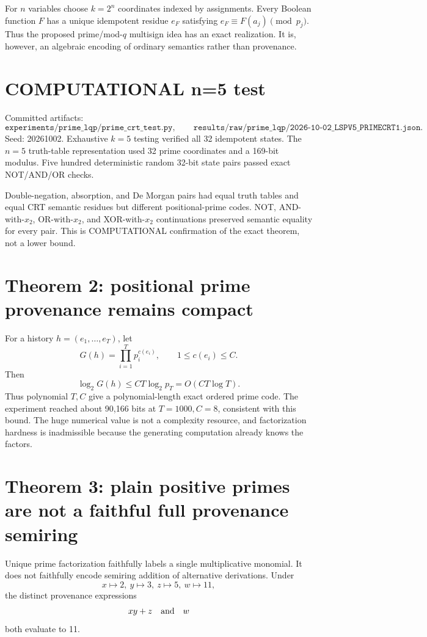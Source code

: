 \documentclass[11pt]{article}
\begin{document}
For \(n\) variables choose \(k=2^n\) coordinates indexed by assignments. Every Boolean function \(F\) has a unique idempotent residue \(e_F\) satisfying \(e_F\equiv F(a_j)\pmod{p_j}\). Thus the proposed prime/mod-\(q\) multisign idea has an exact realization. It is, however, an algebraic encoding of ordinary semantics rather than provenance.

\section*{COMPUTATIONAL n=5 test}
Committed artifacts:
\[
\texttt{experiments/prime\_lqp/prime\_crt\_test.py},
\qquad
\texttt{results/raw/prime\_lqp/2026-10-02\_LSPV5\_PRIMECRT1.json}.
\]
Seed: 20261002. Exhaustive \(k=5\) testing verified all 32 idempotent states. The \(n=5\) truth-table representation used 32 prime coordinates and a 169-bit modulus. Five hundred deterministic random 32-bit state pairs passed exact NOT/AND/OR checks.

Double-negation, absorption, and De Morgan pairs had equal truth tables and equal CRT semantic residues but different positional-prime codes. NOT, AND-with-\(x_2\), OR-with-\(x_2\), and XOR-with-\(x_2\) continuations preserved semantic equality for every pair. This is COMPUTATIONAL confirmation of the exact theorem, not a lower bound.

\section*{Theorem 2: positional prime provenance remains compact}
For a history \(h=(e_1,\ldots,e_T)\), let
\[
G(h)=\prod_{i=1}^{T}p_i^{c(e_i)},\qquad 1\le c(e_i)\le C.
\]
Then
\[
\log_2G(h)\le CT\log_2 p_T=O(CT\log T).
\]
Thus polynomial \(T,C\) give a polynomial-length exact ordered prime code. The experiment reached about 90,166 bits at \(T=1000,C=8\), consistent with this bound. The huge numerical value is not a complexity resource, and factorization hardness is inadmissible because the generating computation already knows the factors.

\section*{Theorem 3: plain positive primes are not a faithful full provenance semiring}
Unique prime factorization faithfully labels a single multiplicative monomial. It does not faithfully encode semiring addition of alternative derivations. Under
\[
x\mapsto2,\ y\mapsto3,\ z\mapsto5,\ w\mapsto11,
\]
the distinct provenance expressions
\[
xy+z\quad\hbox{and}\quad w
\]
both evaluate to 11.
\end{document}

